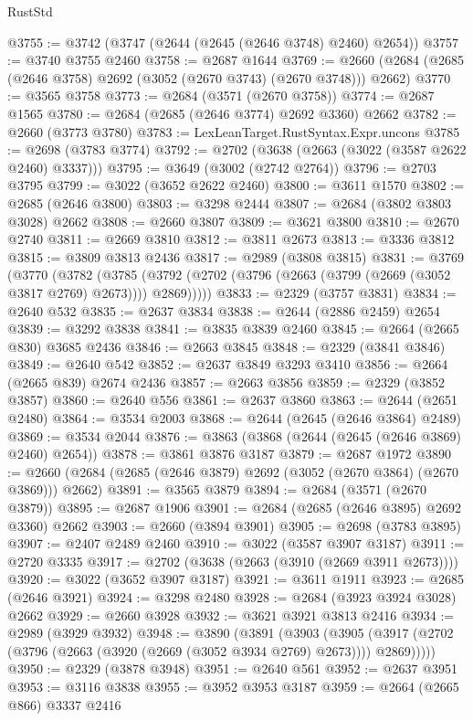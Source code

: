 \begin{lexlean}{RustStd}
\begin{coremodule}
@3755 := @3742 (@3747 (@2644 (@2645 (@2646 @3748) @2460) @2654))
@3757 := @3740 @3755 @2460
@3758 := @2687 @1644
@3769 := @2660 (@2684 (@2685 (@2646 @3758) @2692 (@3052 (@2670 @3743) (@2670 @3748))) @2662)
@3770 := @3565 @3758
@3773 := @2684 (@3571 (@2670 @3758))
@3774 := @2687 @1565
@3780 := @2684 (@2685 (@2646 @3774) @2692 @3360) @2662
@3782 := @2660 (@3773 @3780)
@3783 := LexLeanTarget.RustSyntax.Expr.uncons
@3785 := @2698 (@3783 @3774)
@3792 := @2702 (@3638 (@2663 (@3022 (@3587 @2622 @2460) @3337)))
@3795 := @3649 (@3002 (@2742 @2764))
@3796 := @2703 @3795
@3799 := @3022 (@3652 @2622 @2460)
@3800 := @3611 @1570
@3802 := @2685 (@2646 @3800)
@3803 := @3298 @2444
@3807 := @2684 (@3802 @3803 @3028) @2662
@3808 := @2660 @3807
@3809 := @3621 @3800
@3810 := @2670 @2740
@3811 := @2669 @3810
@3812 := @3811 @2673
@3813 := @3336 @3812
@3815 := @3809 @3813 @2436
@3817 := @2989 (@3808 @3815)
@3831 := @3769
    (@3770
      (@3782
        (@3785 (@3792 (@2702 (@3796 (@2663 (@3799 (@2669 (@3052 @3817 @2769) @2673)))) @2869)))))
@3833 := @2329 (@3757 @3831)
@3834 := @2640 @532
@3835 := @2637 @3834
@3838 := @2644 (@2886 @2459) @2654
@3839 := @3292 @3838
@3841 := @3835 @3839 @2460
@3845 := @2664 (@2665 @830) @3685 @2436
@3846 := @2663 @3845
@3848 := @2329 (@3841 @3846)
@3849 := @2640 @542
@3852 := @2637 @3849 @3293 @3410
@3856 := @2664 (@2665 @839) @2674 @2436
@3857 := @2663 @3856
@3859 := @2329 (@3852 @3857)
@3860 := @2640 @556
@3861 := @2637 @3860
@3863 := @2644 (@2651 @2480)
@3864 := @3534 @2003
@3868 := @2644 (@2645 (@2646 @3864) @2489)
@3869 := @3534 @2044
@3876 := @3863 (@3868 (@2644 (@2645 (@2646 @3869) @2460) @2654))
@3878 := @3861 @3876 @3187
@3879 := @2687 @1972
@3890 := @2660 (@2684 (@2685 (@2646 @3879) @2692 (@3052 (@2670 @3864) (@2670 @3869))) @2662)
@3891 := @3565 @3879
@3894 := @2684 (@3571 (@2670 @3879))
@3895 := @2687 @1906
@3901 := @2684 (@2685 (@2646 @3895) @2692 @3360) @2662
@3903 := @2660 (@3894 @3901)
@3905 := @2698 (@3783 @3895)
@3907 := @2407 @2489 @2460
@3910 := @3022 (@3587 @3907 @3187)
@3911 := @2720 @3335
@3917 := @2702 (@3638 (@2663 (@3910 (@2669 @3911 @2673))))
@3920 := @3022 (@3652 @3907 @3187)
@3921 := @3611 @1911
@3923 := @2685 (@2646 @3921)
@3924 := @3298 @2480
@3928 := @2684 (@3923 @3924 @3028) @2662
@3929 := @2660 @3928
@3932 := @3621 @3921 @3813 @2416
@3934 := @2989 (@3929 @3932)
@3948 := @3890
    (@3891
      (@3903
        (@3905 (@3917 (@2702 (@3796 (@2663 (@3920 (@2669 (@3052 @3934 @2769) @2673)))) @2869)))))
@3950 := @2329 (@3878 @3948)
@3951 := @2640 @561
@3952 := @2637 @3951
@3953 := @3116 @3838
@3955 := @3952 @3953 @3187
@3959 := @2664 (@2665 @866) @3337 @2416

\end{coremodule}
\end{lexlean}
